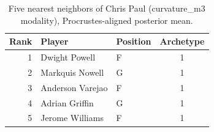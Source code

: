\begin{table}[htbp]
  \centering\small
  \begin{tabular}{rllc}
    \toprule
    Rank & Player & Position & Archetype \\
    \midrule
    1 & Dwight Powell & F & 1 \\
    2 & Markquis Nowell & G & 1 \\
    3 & Anderson Varejao & F & 1 \\
    4 & Adrian Griffin & G & 1 \\
    5 & Jerome Williams & F & 1 \\
    \bottomrule
  \end{tabular}
  \caption{Five nearest neighbors of Chris Paul (curvature_m3 modality), Procrustes-aligned posterior mean.}
  \label{tab:Chris_Paul_neighbors_curvature_m3}
\end{table}

